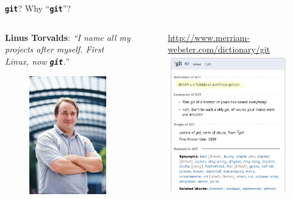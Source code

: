 \documentclass{beamer}
\newcommand{\git}{\texttt{\textbf{git}}\xspace}
\begin{document}
\begin{frame}{\git? Why ``\git''?}
  \begin{columns}
    \begin{column}{5cm}
      \textbf{Linus Torvalds}: 
        \emph{``I name all my projects after myself. First Linux, now
        \git.}''
      \begin{figure}
        \centering
        \includegraphics[width=4cm]{figs/Linus_Torvalds}
      \end{figure}
    \end{column}
    \begin{column}{7cm}
      \begin{figure}
        \url{http://www.merriam-webster.com/dictionary/git}
        \centering
        \includegraphics[width=7cm]{figs/git-merriam}
      \end{figure}
    \end{column}
    \end{columns}
\end{frame}
\end{document}
